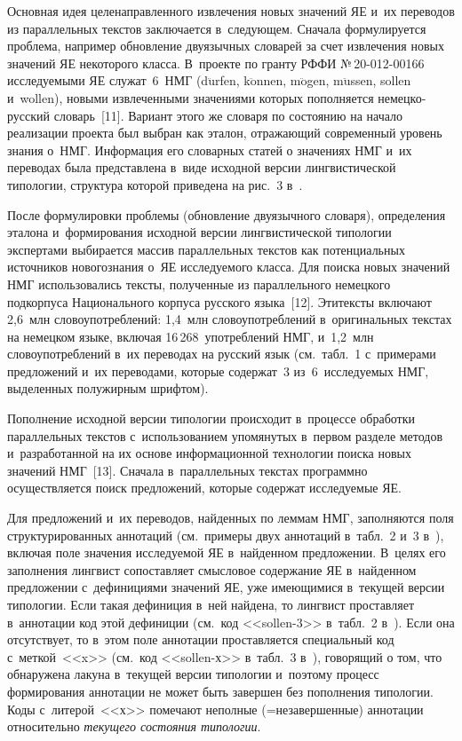 \begin{multicols}{2}
  Основная идея целенаправленного извлечения новых значений 
ЯЕ и~их переводов из параллельных текстов заключается 
в~сле\-ду\-ющем. Сначала формулируется проблема, например обновление 
двуязычных словарей за счет извлечения новых значений ЯЕ некоторого 
класса. В~проекте по гранту РФФИ №\,20-012-00166 исследуемыми ЯЕ 
служат~6~НМГ (d$\ddot{\mbox{u}}$rfen, k$\ddot{\mbox{o}}$nnen, 
m$\ddot{\mbox{o}}$gen, m$\ddot{\mbox{u}}$ssen, sollen и~wollen), новыми 
извлеченными значениями которых пополняется не\-мец\-ко-рус\-ский 
словарь~[11]. Вариант этого же словаря по состоянию на начало реализации 
проекта был выбран как эталон, отражающий современный уровень знания 
о~НМГ. Информация его словарных статей о значениях НМГ и~их переводах 
была представлена в~виде исходной версии лингвистической типологии, 
структура которой приведена на рис.~3 в~\cite{3-z}.
  
  После формулировки проблемы (обновление двуязычного словаря), 
определения эталона и~формирования исходной версии лингвистической 
типологии экспертами выбирается массив параллельных текстов как 
потенциальных источников нового\linebreak знания о~ЯЕ исследуемого класса. Для 
поиска новых значений НМГ использовались тексты, полученные из 
параллельного немецкого подкорпуса Национального корпуса русского 
языка~[12]. Эти\linebreak текс\-ты включают 2,6~млн словоупотреблений: 1,4~млн 
сло\-во\-употреб\-ле\-ний в~оригинальных текстах на немецком языке, включая 
16\,268~употреб\-ле\-ний НМГ, и~1,2~млн словоупотреблений в~их переводах 
на русский язык (см.\ табл.~1 с~примерами предложений и~их переводами, 
которые содержат~3 из~6~исследуемых НМГ, выделенных полужирным 
шрифтом).
  
  Пополнение исходной версии типологии происходит в~процессе обработки 
параллельных текстов с~использованием упомянутых в~первом разделе 
методов и~разработанной на их основе информационной технологии поиска 
новых значений НМГ~[13]. Сначала в~параллельных текстах программно 
осуществляется поиск предложений, которые содержат исследуемые ЯЕ.
  

  
  Для предложений и~их переводов, найденных по леммам НМГ, 
заполняются поля структурированных аннотаций (см.\ примеры двух 
аннотаций в~табл.~2 и~3 в~\cite{14-z}), включая поле значения исследуемой 
ЯЕ в~найденном предложении. В~целях его заполнения лингвист 
сопоставляет смысловое содержание ЯЕ в~найденном предложении 
с~дефинициями значений ЯЕ, уже имеющимися в~текущей версии 
типологии. Если такая дефиниция в~ней найдена, то лингвист проставляет 
в~аннотации код этой дефиниции (см.\ код <<sollen-3>> в~табл.~2  
в~\cite{14-z}). Если она отсутствует, то в~этом поле аннотации проставляется 
специальный код с~меткой~<<x>> (см.\ код <<sollen-х>> в~табл.~3  
в~\cite{14-z}), говорящий о том, что обнаружена лакуна в~текущей версии 
типологии и~поэтому процесс формирования аннотации не может быть 
завершен без пополнения типологии. Коды с~литерой~<<х>> помечают 
неполные (=\;не\-за\-вер\-шен\-ные) аннотации относительно \textit{текущего 
состояния типологии}.
  

\end{multicols}
